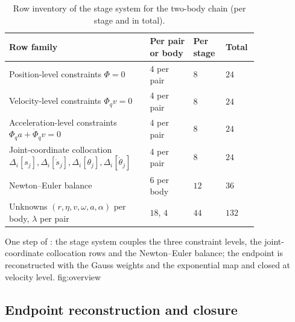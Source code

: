 \begin{table}[!htb]
\centering
\caption{Row inventory of the stage system for the two-body chain (per stage and in total).}
\label{tab:rows}
\small
\begin{tabular}{P{0.46\linewidth}P{0.16\linewidth}P{0.10\linewidth}P{0.10\linewidth}}
\toprule
Row family & Per pair or body & Per stage & Total \\
\midrule
Position-level constraints $\Phi=0$ & $4$ per pair & $8$ & $24$ \\
Velocity-level constraints $\Phi_qv=0$ & $4$ per pair & $8$ & $24$ \\
Acceleration-level constraints $\Phi_qa+\dot\Phi_qv=0$ & $4$ per pair & $8$ & $24$ \\
Joint-coordinate collocation $\Delta_i[s_j],\Delta_i[\dot s_j],\Delta_i[\theta_j],\Delta_i[\dot\theta_j]$ & $4$ per pair & $8$ & $24$ \\
Newton--Euler balance & $6$ per body & $12$ & $36$ \\
\midrule
Unknowns $(r,\eta,v,\omega,a,\alpha)$ per body, $\lambda$ per pair & $18$, $4$ & $44$ & $132$ \\
\bottomrule
\end{tabular}
\end{table}

{One step of \method{}: the stage system couples the three constraint levels, the joint-coordinate
collocation rows and the Newton--Euler balance; the endpoint is reconstructed with the Gauss weights
and the exponential map and closed at velocity level.}
{fig:overview}

\subsection{Endpoint reconstruction and closure}

